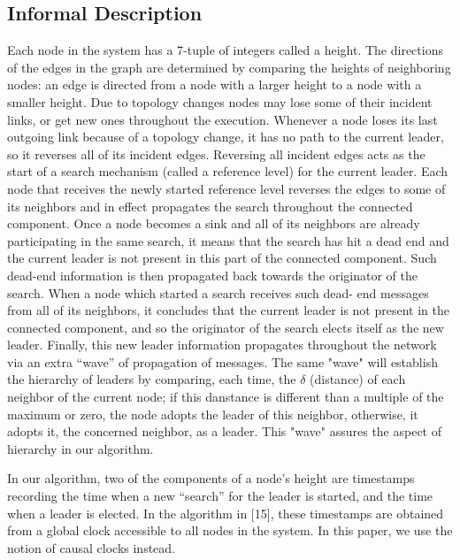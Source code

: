 \documentclass{article}
\begin{document}
\subsection{Informal Description}
Each node in the system has a 7-tuple of integers called a height. The directions of the edges in the graph are determined by comparing the heights of neighboring nodes:
an edge is directed from a node with a larger height to a node with a smaller height.
Due to topology changes nodes may lose some of their incident links, or get new ones
throughout the execution. Whenever a node loses its last outgoing link because of a
topology change, it has no path to the current leader, so it reverses all of its incident
edges. Reversing all incident edges acts as the start of a search mechanism (called
a reference level) for the current leader. Each node that receives the newly started
reference level reverses the edges to some of its neighbors and in effect propagates
the search throughout the connected component. Once a node becomes a sink and
all of its neighbors are already participating in the same search, it means that the
search has hit a dead end and the current leader is not present in this part of the
connected component. Such dead-end information is then propagated back towards
the originator of the search. When a node which started a search receives such dead-
end messages from all of its neighbors, it concludes that the current leader is not
present in the connected component, and so the originator of the search elects itself
as the new leader. Finally, this new leader information propagates throughout the
network via an extra “wave” of propagation of messages. The same "wave" will establish the hierarchy of leaders by comparing, each time, the $\delta$ (distance) of each neighbor of the current node; if this danstance is different than a multiple of the maximum or zero, the node adopts the leader of this neighbor, otherwise, it adopts it, the concerned neighbor, as a leader. This "wave" assures the aspect of hierarchy in our algorithm.

In our algorithm, two of the components of a node’s height are timestamps recording the time when a new “search” for the leader is started, and the time when a leader is elected. In the algorithm in [15], these timestamps are obtained from a global clock accessible to all nodes in the system. In this paper, we use the notion of causal clocks instead.
\end{document}
